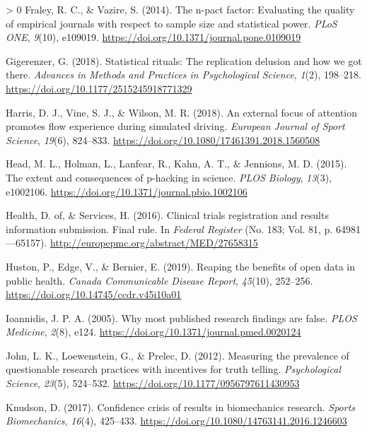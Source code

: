 \documentclass[]{cik}%
\newlength{\cslhangindent}
\newenvironment{CSLReferences}[3] %
 {%
  \setlength{\parindent}{0pt}
  \ifodd #1 \everypar{\setlength{\hangindent}{\cslhangindent}}\ignorespaces\fi
  \ifnum #2 > 0
  \setlength{\parskip}{#2\baselineskip}
  \fi
 }%
 {}
\begin{document}
\begin{CSLReferences}{1}{0}
\leavevmode\hypertarget{ref-fraley2014}{}%
Fraley, R. C., \& Vazire, S. (2014). The n-pact factor: Evaluating the
quality of empirical journals with respect to sample size and
statistical power. \emph{{PLoS} {ONE}}, \emph{9}(10), e109019.
\url{https://doi.org/10.1371/journal.pone.0109019}

\leavevmode\hypertarget{ref-gigerenzer2018}{}%
Gigerenzer, G. (2018). Statistical rituals: The replication delusion and
how we got there. \emph{Advances in Methods and Practices in
Psychological Science}, \emph{1}(2), 198--218.
\url{https://doi.org/10.1177/2515245918771329}

\leavevmode\hypertarget{ref-Harris2018}{}%
Harris, D. J., Vine, S. J., \& Wilson, M. R. (2018). An external focus
of attention promotes flow experience during simulated driving.
\emph{European Journal of Sport Science}, \emph{19}(6), 824--833.
\url{https://doi.org/10.1080/17461391.2018.1560508}

\leavevmode\hypertarget{ref-head_extent_2015}{}%
Head, M. L., Holman, L., Lanfear, R., Kahn, A. T., \& Jennions, M. D.
(2015). The extent and consequences of p-hacking in science. \emph{PLOS
Biology}, \emph{13}(3), e1002106.
\url{https://doi.org/10.1371/journal.pbio.1002106}

\leavevmode\hypertarget{ref-clinreg2016}{}%
Health, D. of, \& Services, H. (2016). Clinical trials registration and
results information submission. Final rule. In \emph{Federal Register}
(No. 183; Vol. 81, p. 64981---65157).
\url{http://europepmc.org/abstract/MED/27658315}

\leavevmode\hypertarget{ref-Huston2019}{}%
Huston, P., Edge, V., \& Bernier, E. (2019). Reaping the benefits of
open data in public health. \emph{Canada Communicable Disease Report},
\emph{45}(10), 252--256. \url{https://doi.org/10.14745/ccdr.v45i10a01}

\leavevmode\hypertarget{ref-ioannidis_why_2005}{}%
Ioannidis, J. P. A. (2005). Why most published research findings are
false. \emph{PLOS Medicine}, \emph{2}(8), e124.
\url{https://doi.org/10.1371/journal.pmed.0020124}

\leavevmode\hypertarget{ref-John_Loewenstein_Prelec_2012}{}%
John, L. K., Loewenstein, G., \& Prelec, D. (2012). Measuring the
prevalence of questionable research practices with incentives for truth
telling. \emph{Psychological Science}, \emph{23}(5), 524--532.
\url{https://doi.org/10.1177/0956797611430953}

\leavevmode\hypertarget{ref-knudson2017}{}%
Knudson, D. (2017). Confidence crisis of results in biomechanics
research. \emph{Sports Biomechanics}, \emph{16}(4), 425--433.
\url{https://doi.org/10.1080/14763141.2016.1246603}


\end{CSLReferences}
\end{document}

